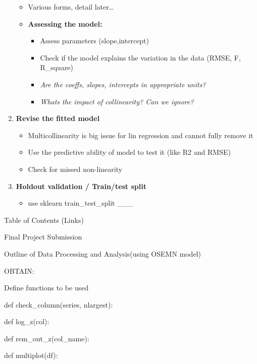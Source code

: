 \documentclass[11pt]{article}
\providecommand{\tightlist}{%
      \setlength{\itemsep}{0pt}\setlength{\parskip}{0pt}}
\begin{document}
\begin{enumerate}
  \begin{itemize}
  \tightlist
  \item
    Various forms, detail later\ldots{}
  \item
    \textbf{Assessing the model:}

    \begin{itemize}
    \tightlist
    \item
      Assess parameters (slope,intercept)
    \item
      Check if the model explains the variation in the data (RMSE, F,
      R\_square)
    \item
      \emph{Are the coeffs, slopes, intercepts in appropriate units?}
    \item
      \emph{Whats the impact of collinearity? Can we ignore?}
    \end{itemize}
  \end{itemize}
\item
  \textbf{Revise the fitted model}

  \begin{itemize}
  \tightlist
  \item
    Multicollinearity is big issue for lin regression and cannot fully
    remove it
  \item
    Use the predictive ability of model to test it (like R2 and RMSE)
  \item
    Check for missed non-linearity
  \end{itemize}
\item
  \textbf{Holdout validation / Train/test split}

  \begin{itemize}
  \tightlist
  \item
    use sklearn train\_test\_split \_\_\_
  \end{itemize}
\end{enumerate}

    Table of Contents (Links){}

{Final Project Submission}

{Outline of Data Processing and Analysis(using OSEMN model)}

{OBTAIN:}

{Define functions to be used}

{def check\_column(series, nlargest):}

{def log\_z(col):}

{def rem\_out\_z(col\_name):}

{def multiplot(df):}
\end{document}

